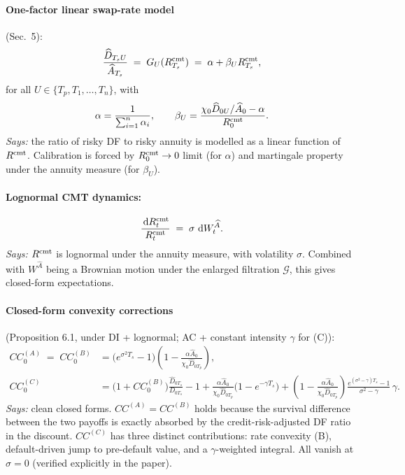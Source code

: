 \documentclass[11pt,a4paper]{article}
\begin{document}
\paragraph{One-factor linear swap-rate model} (Sec.\ 5):
\begin{equation}\label{eq:linear-G}
  \frac{\widehat D_{T_s U}}{\widehat A_{T_s}} \;=\; G_U(R^{\mathrm{cmt}}_{T_s}) \;=\; \alpha + \beta_U R^{\mathrm{cmt}}_{T_s},
\end{equation}
for all $U \in \{T_p, T_1, \ldots, T_n\}$, with
\begin{equation}\label{eq:linear-calib}
  \alpha = \frac{1}{\sum_{i=1}^n \alpha_i}, \qquad
  \beta_U = \frac{\chi_0 \widehat D_{0U} / \widehat A_0 - \alpha}{R^{\mathrm{cmt}}_0}.
\end{equation}
\textit{Says:} the ratio of risky DF to risky annuity is modelled as a
linear function of $R^{\mathrm{cmt}}$. Calibration is forced by $R^{\mathrm{cmt}}_0 \to 0$
limit (for $\alpha$) and martingale property under the annuity measure
(for $\beta_U$).

\paragraph{Lognormal CMT dynamics:}
\begin{equation}\label{eq:lognormal-dyn}
  \frac{\,\mathrm{d} R^{\mathrm{cmt}}_t}{R^{\mathrm{cmt}}_t} \;=\; \sigma \, \,\mathrm{d} W^{\widehat A}_t.
\end{equation}
\textit{Says:} $R^{\mathrm{cmt}}$ is lognormal under the annuity measure, with
volatility $\sigma$. Combined with $W^{\widehat A}$ being a Brownian
motion under the enlarged filtration $\mathcal G$, this gives
closed-form expectations.

\paragraph{Closed-form convexity corrections} (Proposition 6.1, under DI + lognormal; AC + constant intensity $\gamma$ for (C)):
\begin{align}
  CC^{(A)}_0 \;=\; CC^{(B)}_0 &= \bigl(e^{\sigma^2 T_s} - 1\bigr) \left(1 - \frac{\alpha \widehat A_0}{\chi_0 \widehat D_{0 T_p}}\right), \label{eq:cc-AB}\\
  CC^{(C)}_0 &= \bigl(1 + CC^{(B)}_0\bigr) \frac{\widehat D_{0 T_s}}{D_{0 T_s}} - 1
              + \frac{\alpha \widehat A_0}{\chi_0 \widehat D_{0 T_p}}\bigl(1 - e^{-\gamma T_s}\bigr)
              + \left(1 - \frac{\alpha \widehat A_0}{\chi_0 \widehat D_{0 T_p}}\right) \frac{e^{(\sigma^2 - \gamma) T_s} - 1}{\sigma^2 - \gamma}\, \gamma. \label{eq:cc-C}
\end{align}
\textit{Says:} clean closed forms. $CC^{(A)} = CC^{(B)}$ holds because
the survival difference between the two payoffs is exactly absorbed
by the credit-risk-adjusted DF ratio in the discount. $CC^{(C)}$ has
three distinct contributions: rate convexity (B), default-driven jump
to pre-default value, and a $\gamma$-weighted integral. All vanish at
$\sigma = 0$ (verified explicitly in the paper).
\end{document}

